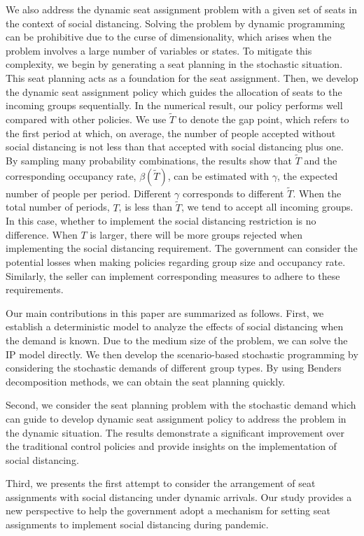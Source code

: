 We also address the dynamic seat assignment problem with a given set of seats in the context of social distancing. Solving the problem by dynamic programming can be prohibitive due to the curse of dimensionality, which arises when the problem involves a large number of variables or states. To mitigate this complexity, we begin by generating a seat planning in the stochastic situation. This seat planning acts as a foundation for the seat assignment. Then, we develop the dynamic seat assignment policy which guides the allocation of seats to the incoming groups sequentially. In the numerical result, our policy performs well compared with other policies. 
We use $\tilde{T}$ to denote the gap point, which refers to the first period at which, on average, the number of people accepted without social distancing is not less than that accepted with social distancing plus one. By sampling many probability combinations, the results show that $\tilde{T}$ and the corresponding occupancy rate, $\beta(\tilde{T})$, can be estimated with $\gamma$, the expected number of people per period. Different $\gamma$ corresponds to different $\tilde{T}$. When the total number of periods, $T$, is less than $\tilde{T}$, we tend to accept all incoming groups. In this case, whether to implement the social distancing restriction is no difference. When $T$ is larger, there will be more groups rejected when implementing the social distancing requirement. The government can consider the potential losses when making policies regarding group size and occupancy rate. Similarly, the seller can implement corresponding measures to adhere to these requirements.


Our main contributions in this paper are summarized as follows. First, we establish a deterministic model to analyze the effects of social distancing when the demand is known. Due to the medium size of the problem, we can solve the IP model directly. We then develop the scenario-based stochastic programming by considering the stochastic demands of different group types. By using Benders decomposition methods, we can obtain the seat planning quickly. 

Second, we consider the seat planning problem with the stochastic demand which can guide to develop dynamic seat assignment policy to address the problem in the dynamic situation. The results demonstrate a significant improvement over the traditional control policies and provide insights on the implementation of social distancing.

Third, we presents the first attempt to consider the arrangement of seat assignments with social distancing under dynamic arrivals. Our study provides a new perspective to help the government adopt a mechanism for setting seat assignments to implement social distancing during pandemic.

